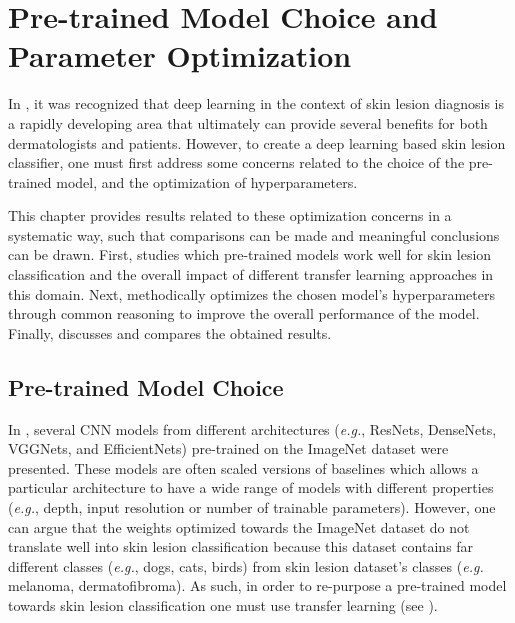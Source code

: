 \chapter{Pre-trained Model Choice and Parameter Optimization}
\label{chapter:experiments}

In , it was recognized that deep learning in the context of skin lesion diagnosis is a rapidly developing area that ultimately can provide several benefits for both dermatologists and patients. However, to create a deep learning based skin lesion classifier, one must first address some concerns related to the choice of the pre-trained model, and the optimization of hyperparameters. \par

This chapter provides results related to these optimization concerns in a systematic way, such that comparisons can be made and meaningful conclusions can be drawn. First,  studies which pre-trained models work well for skin lesion classification and the overall impact of different transfer learning approaches in this domain. Next,  methodically optimizes the chosen model's hyperparameters through common reasoning to improve the overall performance of the model. Finally,  discusses and compares the obtained results. \par 

\section{Pre-trained Model Choice} 
\label{section:models}
    
    In , several \ac{CNN} models from different architectures (\textit{e.g.}, ResNets, DenseNets, VGGNets, and EfficientNets) pre-trained on the ImageNet dataset  \cite{Deng2010} were presented. These models are often scaled versions of baselines which allows a particular architecture to have a wide range of models with different properties (\textit{e.g.}, depth, input resolution or number of trainable parameters). However, one can argue that the weights optimized towards the ImageNet dataset do not translate well into skin lesion classification because this dataset contains far different classes (\textit{e.g.}, dogs, cats, birds) from skin lesion dataset's classes (\textit{e.g.} melanoma, dermatofibroma). As such, in order to re-purpose a pre-trained model towards skin lesion classification one must use transfer learning (see ). \par
    
